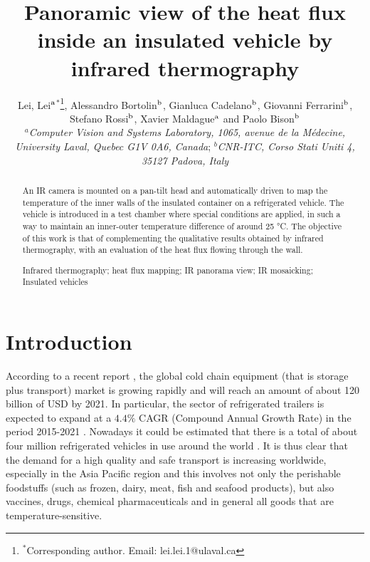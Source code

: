 \documentclass{tQRT2e}
\begin{document}


\title{Panoramic view of the heat flux inside an insulated vehicle by infrared thermography}

\author{Lei, Lei$^{\rm a}$$^{\ast}$\thanks{$^\ast$Corresponding author. Email: lei.lei.1@ulaval.ca
		\vspace{6pt}},  Alessandro Bortolin$^{\rm b}$, Gianluca Cadelano$^{\rm b}$, Giovanni Ferrarini$^{\rm b}$, Stefano Rossi$^{\rm b}$, Xavier Maldague$^{\rm a}$ and Paolo Bison$^{\rm b}$  \\\vspace{6pt}  $^{a}${\em{Computer Vision and Systems Laboratory, 1065, avenue de la Médecine, University Laval, Quebec G1V 0A6, Canada}};
	$^{b}${\em{CNR-ITC, Corso Stati Uniti 4, 35127 Padova, Italy}} \\\received{} }

\maketitle

\begin{abstract}
	An IR camera is mounted on a pan-tilt head and automatically driven to map the temperature of the inner walls of the insulated container on a refrigerated vehicle. The vehicle is introduced in a test chamber where special conditions are applied, in such a way to maintain an inner-outer temperature difference of around 25 °C. The objective of this work is that of complementing the qualitative results obtained by infrared thermography, with an evaluation of the heat flux flowing through the wall.
	
\begin{keywords} Infrared thermography; heat flux mapping; IR panorama view; IR mosaicking; Insulated vehicles 
\end{keywords}
\end{abstract}

%
%
\section{Introduction}
According to a recent report \cite{Zion2016}, the global cold chain equipment (that is storage plus transport) market is growing rapidly and will reach an amount of about 120 billion of USD by 2021. In particular, the sector of refrigerated trailers is expected to expand at a $ 4.4\% $ CAGR (Compound Annual Growth Rate) in the period 2015-2021 \cite{RM2015}. Nowadays it could be estimated that there is a total of about four million refrigerated vehicles in use around the world \cite{UNEP2010}. It is thus clear that the demand for a high quality and safe transport is increasing worldwide, especially in the Asia Pacific region and this involves not only the perishable foodstuffs (such as frozen, dairy, meat, fish and seafood products), but also vaccines, drugs, chemical pharmaceuticals and in general all goods that are temperature-sensitive. 
\end{document}

